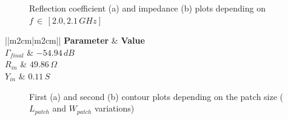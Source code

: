 \documentclass[10 pt,a4paper,twocolumn]{article}
\begin{document}
{%

\begin{figure}[bt!]
	\centering
	\begin{subfigure}[b]{0.42\linewidth}
		\def\svgwidth{\linewidth}
		\tiny{}
		\caption{}
	\end{subfigure}
\hspace{0.1\linewidth}
	\begin{subfigure}[b]{0.4\linewidth}
		\def\svgwidth{\linewidth}
		\tiny{}
		\caption{}
	\end{subfigure}
	\caption{Reflection coefficient (a) and impedance (b) plots depending on $f\,\in\,[2.0,2.1\,GHz]$}
	\label{fig:Gamma and Z previa wfeed}
\end{figure}


\begin{table}
	\begin{center}
		{\selectfont	\begin{tabular}{||m{2cm}|m{2cm}||}
				\hline
				\textbf{Parameter} & \textbf{Value}\\
				\hline
				$\Gamma_{final}$ & $-54.94\,dB$\\
				\hline
				$R_{in}$ & $49.86\,\Omega$ \\
				\hline
				$Y_{in}$ & $ 0.11\,S$ \\
				\hline
		\end{tabular}}
		\caption{Final $\Gamma$ and impedance matching values after last optimization choice: the $w_{feed}$ change}
		\label{table:Gamma and Z}
	\end{center}
\end{table}
\begin{figure}[bt!]
	\begin{subfigure}{0.48\linewidth}
		\def\svgwidth{\linewidth}
		\tiny{}
		\caption{}
		\label{fig:first contour}
	\end{subfigure}
	\hfill
	\begin{subfigure}{0.48\linewidth}
		\def\svgwidth{\linewidth}
		\tiny{}
		\caption{}
		\label{fig:second contour}
	\end{subfigure}
	\caption{First (a) and second (b) contour plots depending on the patch size ($L_{patch}$ and $W_{patch}$ variations)}
\end{figure}


}
\end{document}
